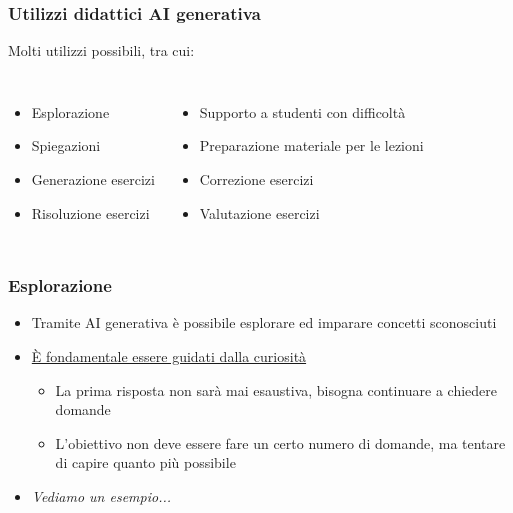 
\begin{contentframe}
    \frametitle{Utilizzi didattici AI generativa}

    Molti utilizzi possibili, tra cui:
    
    \begin{columns}
        \begin{itemize}
            \item Esplorazione
            \item Spiegazioni
            \item Generazione esercizi
            \item Risoluzione esercizi
        \end{itemize}
        
        \begin{itemize}
            \item Supporto a studenti con difficoltà
            \item Preparazione materiale per le lezioni
            \item Correzione esercizi
            \item Valutazione esercizi
        \end{itemize}
    \end{columns}
\end{contentframe}

\begin{contentframe}
    \frametitle{Esplorazione}

    \begin{itemize}
        \item Tramite AI generativa è possibile esplorare ed imparare concetti sconosciuti
        \item \underline{È fondamentale essere guidati dalla curiosità}
        \begin{itemize}
            \item La prima risposta non sarà mai esaustiva, bisogna continuare a chiedere domande
            \item L'obiettivo non deve essere fare un certo numero di domande, ma tentare di capire quanto più possibile
        \end{itemize}

        \bigskip
        \item \textit{Vediamo un esempio...}
    \end{itemize}
    
\end{contentframe}

